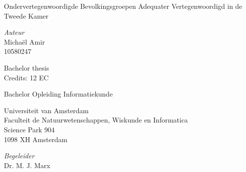 

\begin{center}

\vspace{2.5cm}

\begin{Huge}
Ondervertegenwoordigde Bevolkingsgroepen Adequater Vertegenwoordigd in de Tweede Kamer
\end{Huge}

\vspace{1.5cm}

\emph{Auteur}\\
Micha\"{e}l Amir\\
10580247

\vspace{1.5cm}

Bachelor thesis\\
Credits: 12 EC

\vspace{0.5cm}

Bachelor Opleiding Informatiekunde

\vspace{0.25cm}

Universiteit van Amsterdam\\
Faculteit de Natuurwetenschappen, Wiskunde en Informatica\\
Science Park 904\\
1098 XH Amsterdam

\vspace{4cm}

\emph{Begeleider}\\
Dr. M. J. Marx

\vspace{0.25cm}


\end{center}
